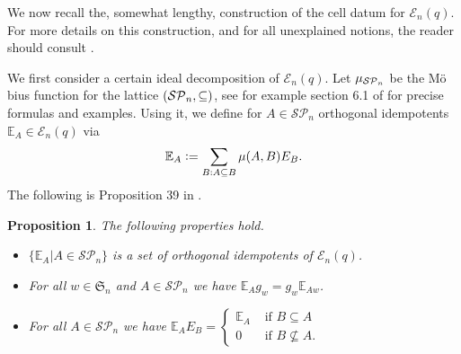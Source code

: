 \documentclass[10pt,a4,twoside,hidelinks,rm]{article}
\newcommand{\Si}{\mathfrak{S}}
\newcommand{\E}{ {\mathcal E}_n(q)}
\newcommand{\EE}{ {\mathcal E}_n}
\newcommand\be{\mathbb{E}}
\theoremstyle{plain}
\newtheorem{propos}[teo]{Proposition}%
\begin{document}
\medskip
We now recall the, somewhat lengthy, construction of the cell datum for $ \E$. 
For more details on this construction, {\color{black} and for all unexplained notions}, the reader should consult \cite{ER}.

We first consider a certain ideal decomposition of $ \E$.
Let $  \mu_{ {\cal SP}_n}  $ be the M\"o%
bius function for the
  lattice $ ({\cal SP}_n, \subseteq)$, {\color{black} see for example section 6.1 of \cite{ER} for 
    precise formulas and examples}.
Using it, we define 
for $A\in \mathcal{SP}_n$ orthogonal idempotents $\mathbb{E}_A \in \E$
via 
\begin{equation}{\label{moebius}}
\mathbb{E}_A:= \sum_{B: A \subseteq B }\mu(A,B)E_B.
\end{equation}
The following is Proposition 39 in \cite{ER}.
\begin{propos}\label{commuting} The following properties hold.
\begin{itemize}
\setlength\itemsep{-1.3em}
\item[(1)] $ \{ \mathbb{E}_A | A \in \mathcal{SP}_n \} $ is a set of orthogonal idempotents of $ \E$. \newline
\item[(2)] For all $w\in\Si_n$ and $A\in \mathcal{SP}_n$ we have $\be_A g_w=g_w\be_{Aw}$. \newline
\item[(3)] For all $A\in \mathcal{SP}_n$ we have $\be_{A}E_B=\left\{\begin{array}{ll}\be_{A}&\mbox{ if } B\subseteq A\\
0&\mbox{ if } B\not\subseteq A.  \end{array}\right.$
\end{itemize}
\end{propos}
\end{document}
